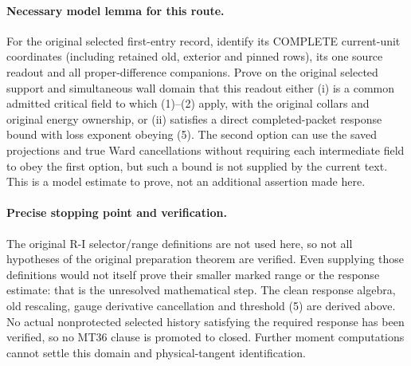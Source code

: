 \documentclass[11pt]{article}
\begin{document}
\paragraph{Necessary model lemma for this route.}
For the original selected first-entry record, identify its COMPLETE current-unit
coordinates (including retained old, exterior and pinned rows), its one source
readout and all proper-difference companions. Prove on the original selected
support and simultaneous wall domain that this readout either (i) is a common
admitted critical field to which (1)--(2) apply, with the original collars and
original energy ownership, or (ii) satisfies a direct completed-packet response
bound with loss exponent obeying (5). The second option can use the saved
projections and true Ward cancellations without requiring each intermediate field
to obey the first option, but such a bound is not supplied by the current text.
This is a model estimate to prove, not an additional assertion made here.

\paragraph{Precise stopping point and verification.}
The original R-I selector/range definitions are not used here, so not all hypotheses
of the original preparation theorem are verified.
Even supplying those definitions would not itself prove their smaller marked
range or the response estimate: that is the unresolved mathematical step.
The clean response algebra, old rescaling, gauge derivative cancellation and
threshold (5) are derived above. No actual nonprotected selected
history satisfying the required response has been verified, so no MT36 clause
is promoted to closed. Further moment computations cannot settle this domain
and physical-tangent identification.
\end{document}
